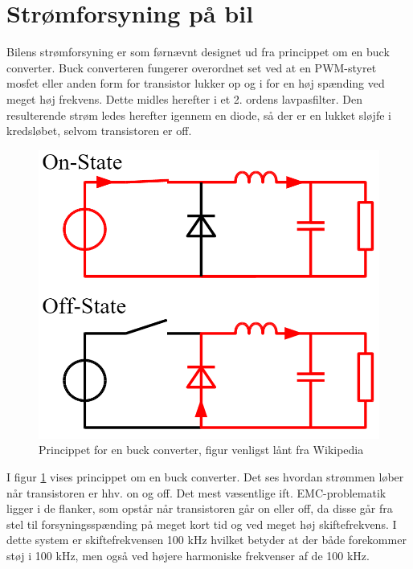 \section{Strømforsyning på bil}

Bilens strømforsyning er som førnævnt designet ud fra princippet om en buck converter. Buck converteren fungerer overordnet set ved at en PWM-styret mosfet eller anden form for transistor lukker op og i for en høj spænding ved meget høj frekvens. 
Dette midles herefter i et 2. ordens lavpasfilter.
Den resulterende strøm ledes herefter igennem en diode, så der er en lukket sløjfe i kredsløbet, selvom transistoren er off.

\begin{figure}[h]
\centering
\includegraphics[width=\textwidth * 1/2]{../fig/billeder/buck_circuit_diagram}
\caption{Princippet for en buck converter, figur venligst lånt fra Wikipedia}
\label{fig:buck_conv}
\end{figure}

I figur \ref{fig:buck_conv} vises princippet om en buck converter. 
Det ses hvordan strømmen løber når transistoren er hhv. on og off.
Det mest væsentlige ift. EMC-problematik ligger i de flanker, som opstår når transistoren går on eller off, da disse går fra stel til forsyningsspænding på meget kort tid og ved meget høj skiftefrekvens.
I dette system er skiftefrekvensen 100 kHz hvilket betyder at der både forekommer støj i 100 kHz, men også ved højere harmoniske frekvenser af de 100 kHz.
\clearpage

